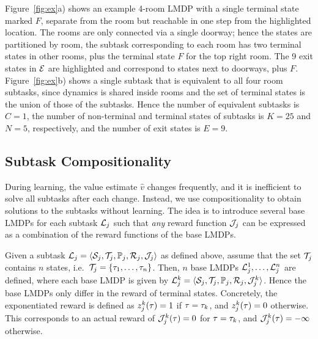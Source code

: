 \begin{example}
 Figure~\ref{fig:ex}a) shows an example 4-room LMDP with a single terminal state marked $F$, separate from the room but reachable in one step from the highlighted location. The rooms are only connected via a single doorway; hence the states are partitioned by room, the subtask corresponding to each room has two terminal states in other rooms, plus the terminal state $F$ for the top right room. The 9 exit states in $\mathcal{E}$ are highlighted and correspond to states next to doorways, plus $F$. Figure~\ref{fig:ex}b) shows a single subtask that is equivalent to all four room subtasks, since dynamics is shared inside rooms and the set of terminal states is the union of those of the subtasks.
Hence the number of equivalent subtasks is $C=1$, the number of non-terminal and terminal states of subtasks is $K=25$ and $N=5$, respectively, and the number of exit states is $E=9$.
\end{example}

\subsection{Subtask Compositionality}

During learning, the value estimate $\widehat{v}$ changes frequently, and it is inefficient to solve all subtasks after each change. Instead, we use compositionality to obtain solutions to the subtasks without learning. The idea is to introduce several base LMDPs for each subtask $\mathcal{L}_j$ such that {\em any} reward function $\mathcal{J}_j$ can be expressed as a combination of the reward functions of the base LMDPs.

Given a subtask $\mathcal{L}_j=\langle\mathcal{S}_j,\mathcal{T}_j,\mathbb{P}_j,\mathcal{R}_j,\mathcal{J}_j\rangle$ as defined above, assume that the set $\mathcal{T}_j$ contains $n$ states, i.e.~$\mathcal{T}_j=\{\tau_1,\ldots,\tau_n\}$. Then, $n$ base LMDPs $\mathcal{L}_j^1,\ldots,\mathcal{L}_j^n$ are defined, where each base LMDP is given by $\mathcal{L}_j^k=\langle\mathcal{S}_j,\mathcal{T}_j,\mathbb{P}_j,\mathcal{R}_j,\mathcal{J}_j^k\rangle$. Hence the base LMDPs only differ in the reward of terminal states.
Concretely, the exponentiated reward is defined as $z_j^k(\tau)=1$ if $\tau=\tau_k$, and $z_j^k(\tau)=0$ otherwise.
This corresponds to an actual reward of $\mathcal{J}_j^k(\tau)=0$ for $\tau=\tau_k$, and $\mathcal{J}_j^k(\tau)=-\infty$ otherwise.

